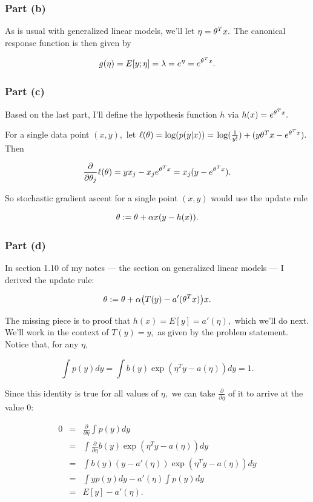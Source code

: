 \documentclass[]{article}
\begin{document}
\subsubsection{Part (b)}\label{part-b-1}

As is usual with generalized linear models, we'll let \(\eta = \theta^Tx.\)
The canonical response function is then given by

\[g(\eta) = E[y;\eta] = \lambda = e^\eta = e^{\theta^Tx}.\]

\subsubsection{Part (c)}\label{part-c-1}

Based on the last part, I'll define the hypothesis function \(h\) via
\(h(x) = e^{\theta^Tx}.\)

For a single data point \((x, y),\) let \(\ell(\theta) = \log(p(y|x)) =\)
\(\log(\frac{1}{y!}) + (y\theta^T x-e^{\theta^Tx}).\) Then

\[\frac{\partial}{\partial\theta_j}\ell(\theta) = yx_j - x_je^{\theta^Tx}
= x_j(y-e^{\theta^Tx}).\]

So stochastic gradient ascent for a single point \((x, y)\) would use
the update rule

\[\theta := \theta + \alpha x(y - h(x)).\]

\subsubsection{Part (d)}\label{part-d}

In section 1.10 of my notes --- the section on generalized linear models
--- I derived the update rule:

\[\theta := \theta + \alpha\big(T(y)-a'(\theta^Tx)\big)x.\]

The missing piece is to proof that \(h(x) = E[y] = a'(\eta),\) which
we'll do next. We'll work in the context of \(T(y)=y,\) as given by the
problem statement. Notice that, for any \(\eta,\)

\[\int p(y)dy = \int b(y)\exp(\eta^Ty - a(\eta))dy = 1.\]

Since this identity is true for all values of \(\eta,\) we can take
\(\frac{\partial}{\partial\eta}\) of it to arrive at the value 0:

\[\begin{array}{rcl}
 0 & = & \frac{\partial}{\partial\eta}\int p(y)dy \\
   & = & \int \frac{\partial}{\partial\eta} b(y)\exp(\eta^Ty - a(\eta))dy \\
   & = & \int b(y)(y - a'(\eta))\exp(\eta^Ty - a(\eta)) dy \\
   & = & \int y p(y)dy - a'(\eta)\int p(y)dy \\
   & = & E[y] - a'(\eta).
\end{array}\]
\end{document}
